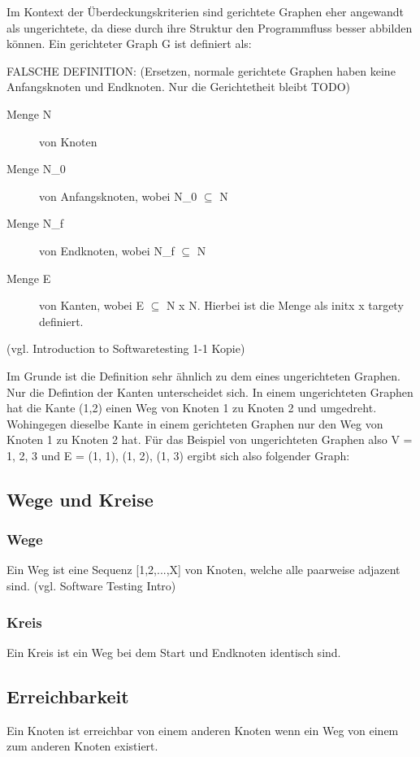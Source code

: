Im Kontext der Überdeckungskriterien sind gerichtete Graphen eher angewandt als ungerichtete, da diese durch ihre
Struktur den Programmfluss besser abbilden können.
Ein gerichteter Graph G ist definiert als:


FALSCHE DEFINITION: (Ersetzen, normale gerichtete Graphen haben keine Anfangsknoten und Endknoten. Nur die Gerichtetheit bleibt TODO)
\begin{description}
    \item[Menge N] von Knoten
    \item[Menge N_{0}] von Anfangsknoten, wobei N_{0} $\subseteq$ N
    \item[Menge N_{f}] von Endknoten, wobei N_{f} $\subseteq$ N
    \item[Menge E] von Kanten, wobei E $\subseteq$ N x N. Hierbei ist die Menge als init{x} x target{y} definiert.
\end{description} (vgl. Introduction to Softwaretesting 1-1 Kopie)

Im Grunde ist die Definition sehr ähnlich zu dem eines ungerichteten Graphen. Nur die Defintion der Kanten unterscheidet
sich. In einem ungerichteten Graphen hat die Kante (1,2) einen Weg von Knoten 1 zu Knoten 2 und umgedreht.
Wohingegen dieselbe Kante in einem gerichteten Graphen nur den Weg von Knoten 1 zu Knoten 2 hat.
Für das Beispiel von ungerichteten Graphen also V = {1, 2, 3} und E = {(1, 1), (1, 2), (1, 3)} ergibt sich also folgender Graph:

\begin{center}
\end{center}

\subsection{Wege und Kreise}
\subsubsection{Wege}
Ein Weg ist eine Sequenz [1,2,...,X] von Knoten, welche alle paarweise adjazent sind. (vgl. Software Testing Intro)

\subsubsection{Kreis}
Ein Kreis ist ein Weg bei dem Start und Endknoten identisch sind.

\subsection{Erreichbarkeit}
Ein Knoten ist erreichbar von einem anderen Knoten wenn ein Weg von einem zum anderen Knoten existiert.


